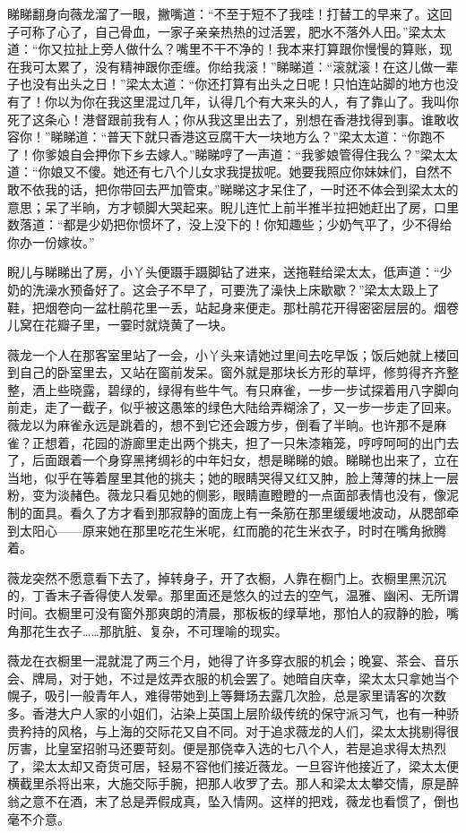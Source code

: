 \par 睇睇翻身向薇龙溜了一眼，撇嘴道：“不至于短不了我哇！打替工的早来了。这回子可称了心了，自己骨血，一家子亲亲热热的过活罢，肥水不落外人田。”梁太太道：“你又拉扯上旁人做什么？嘴里不干不净的！我本来打算跟你慢慢的算账，现在我可太累了，没有精神跟你歪缠。你给我滚！”睇睇道：“滚就滚！在这儿做一辈子也没有出头之日！”梁太太道：“你还打算有出头之日呢！只怕连站脚的地方也没有了！你以为你在我这里混过几年，认得几个有大来头的人，有了靠山了。我叫你死了这条心！港督跟前我有人；你从我这里出去了，别想在香港找得到事。谁敢收容你！”睇睇道：“普天下就只香港这豆腐干大一块地方么？”梁太太道：“你跑不了！你爹娘自会押你下乡去嫁人。”睇睇哼了一声道：“我爹娘管得住我么？”梁太太道：“你娘又不傻。她还有七八个儿女求我提拔呢。她要我照应你妹妹们，自然不敢不依我的话，把你带回去严加管束。”睇睇这才呆住了，一时还不体会到梁太太的意思；呆了半晌，方才顿脚大哭起来。睨儿连忙上前半推半拉把她赶出了房，口里数落道：“都是少奶把你惯坏了，没上没下的！你知趣些；少奶气平了，少不得给你办一份嫁妆。”
\par 睨儿与睇睇出了房，小丫头便蹑手蹑脚钻了进来，送拖鞋给梁太太，低声道：“少奶的洗澡水预备好了。这会子不早了，可要洗了澡快上床歇歇？”梁太太趿上了鞋，把烟卷向一盆杜鹃花里一丢，站起身来便走。那杜鹃花开得密密层层的。烟卷儿窝在花瓣子里，一霎时就烧黄了一块。
\par 薇龙一个人在那客室里站了一会，小丫头来请她过里间去吃早饭；饭后她就上楼回到自己的卧室里去，又站在窗前发呆。窗外就是那块长方形的草坪，修剪得齐齐整整，洒上些晓露，碧绿的，绿得有些牛气。有只麻雀，一步一步试探着用八字脚向前走，走了一截子，似乎被这愚笨的绿色大陆给弄糊涂了，又一步一步走了回来。薇龙以为麻雀永远是跳着的，想不到它还会踱方步，倒看了半晌。也许那不是麻雀？正想着，花园的游廊里走出两个挑夫，担了一只朱漆箱笼，哼哼呵呵的出门去了，后面跟着一个身穿黑拷绸衫的中年妇女，想是睇睇的娘。睇睇也出来了，立在当地，似乎在等着屋里其他的挑夫；她的眼睛哭得又红又肿，脸上薄薄的抹上一层粉，变为淡赭色。薇龙只看见她的侧影，眼睛直瞪瞪的一点面部表情也没有，像泥制的面具。看久了方才看到那寂静的面庞上有一条筋在那里缓缓地波动，从腮部牵到太阳心——原来她在那里吃花生米呢，红而脆的花生米衣子，时时在嘴角掀腾着。
\par 薇龙突然不愿意看下去了，掉转身子，开了衣橱，人靠在橱门上。衣橱里黑沉沉的，丁香末子香得使人发晕。那里面还是悠久的过去的空气，温雅、幽闲、无所谓时间。衣橱里可没有窗外那爽朗的清晨，那板板的绿草地，那怕人的寂静的脸，嘴角那花生衣子……那肮脏、复杂，不可理喻的现实。
\par 薇龙在衣橱里一混就混了两三个月，她得了许多穿衣服的机会；晚宴、茶会、音乐会、牌局，对于她，不过是炫弄衣服的机会罢了。她暗自庆幸，梁太太只拿她当个幌子，吸引一般青年人，难得带她到上等舞场去露几次脸，总是家里请客的次数多。香港大户人家的小姐们，沾染上英国上层阶级传统的保守派习气，也有一种骄贵矜持的风格，与上海的交际花又自不同。对于追求薇龙的人们，梁太太挑剔得很厉害，比皇室招驸马还要苛刻。便是那侥幸入选的七八个人，若是追求得太热烈了，梁太太却又奇货可居，轻易不容他们接近薇龙。一旦容许他接近了，梁太太便横截里杀将出来，大施交际手腕，把那人收罗了去。那人和梁太太攀交情，原是醉翁之意不在酒，末了总是弄假成真，坠入情网。这样的把戏，薇龙也看惯了，倒也毫不介意。
